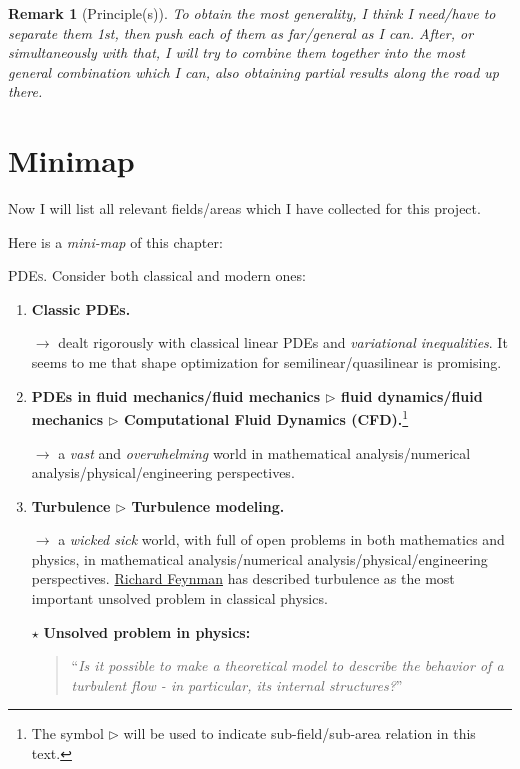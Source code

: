 \documentclass{book}
\numberwithin{equation}{section}
\newtheorem{remark}{Remark}[section]
\begin{document}
\begin{remark}[Principle(s)]
    To obtain the most generality, I think I need/have to separate them 1st, then push each of them as far/general as I can. After, or simultaneously with that, I will try to combine them together into the most general combination which I can, also obtaining partial results along the road up there.
\end{remark}

\section*{Minimap}
Now I will list all relevant fields/areas which I have collected for this project.

Here is a \textit{mini-map} of this chapter:

\begin{tcolorbox}
    \textsc{PDEs.} Consider both classical and modern ones:
    \begin{enumerate}
        \item \textbf{Classic PDEs.}
        
        $\to$ \cite{Sokolowski_Zolesio1992} dealt rigorously with classical linear PDEs and \textit{variational inequalities}. It seems to me that shape optimization for semilinear/quasilinear is promising.
        \item \textbf{PDEs in fluid mechanics/fluid mechanics $\triangleright$ fluid dynamics/fluid mechanics $\triangleright$ Computational Fluid Dynamics (CFD).}\footnote{The symbol $\triangleright$ will be used to indicate sub-field/sub-area relation in this text.}
        
        $\to$ a \textit{vast} and \textit{overwhelming} world in mathematical analysis/numerical analysis/physical/engineering perspectives.
        \item \textbf{Turbulence $\triangleright$ Turbulence modeling.}
        
        $\to$ a \textit{wicked sick} world, with full of open problems in both mathematics and physics, in mathematical analysis/numerical analysis/physical/engineering perspectives. \href{https://en.wikipedia.org/wiki/Richard_Feynman}{Richard Feynman} has described turbulence as the most important unsolved problem in classical physics.
        
        $\star$ \textbf{Unsolved problem in physics:}
        \begin{quotation}
            ``\textit{Is it possible to make a theoretical model to describe the behavior of a turbulent flow - in particular, its internal structures?}''
        \end{quotation}        
    \end{enumerate}
\end{tcolorbox}
\end{document}
